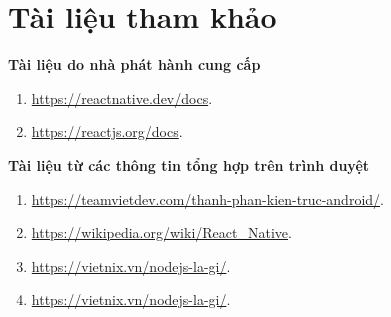 \newpage
\section*{\centering Tài liệu tham khảo}

\textbf{Tài liệu do nhà phát hành cung cấp}
\begin{enumerate}
	\item \url{https://reactnative.dev/docs}.
	\item \url{https://reactjs.org/docs}.
\end{enumerate}

\textbf{Tài liệu từ các thông tin tổng hợp trên trình duyệt}
\begin{enumerate}
	\item \url{https://teamvietdev.com/thanh-phan-kien-truc-android/}.
	\item \url{https://wikipedia.org/wiki/React_Native}.
	\item \url{https://vietnix.vn/nodejs-la-gi/}.
	\item \url{https://vietnix.vn/nodejs-la-gi/}.
\end{enumerate}
\newpage